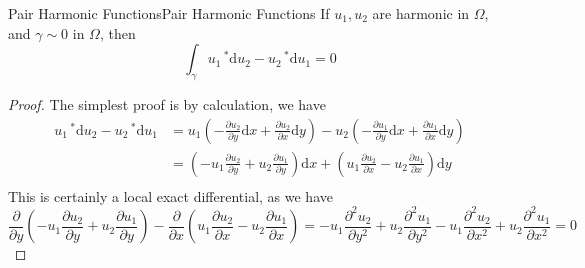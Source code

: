 \documentclass[../main.tex]{subfiles}
\begin{document}
\begin{theorem}{Pair Harmonic Functions}{Pair Harmonic Functions}
	If $u_1,u_2$ are harmonic in $\Omega$, and $\gamma\sim 0$ in $\Omega$, then
	\begin{equation}
		\int_{\gamma} u_1 \, ^* \mathrm{d} u_2 - u_2 \, ^* \mathrm{d} u_1 = 0
	\end{equation}
\end{theorem}
\begin{proof}
	The simplest proof is by calculation, we have
	\begin{equation*}
		\begin{aligned}
			u_1 \, ^* \mathrm{d} u_2 - u_2 \, ^* \mathrm{d} u_1 &= u_1 \left(-\frac{\partial u_2}{\partial y} \mathrm{d} x + \frac{\partial u_2}{\partial x} \mathrm{d} y\right) - u_2 \left(-\frac{\partial u_1}{\partial y} \mathrm{d} x + \frac{\partial u_1}{\partial x} \mathrm{d} y\right)\\
									    &= \left(-u_1 \frac{\partial u_2}{\partial y} + u_2 \frac{\partial u_1}{\partial y}\right) \mathrm{d} x + \left(u_1 \frac{\partial u_2}{\partial x} - u_2 \frac{\partial u_1}{\partial x}\right) \mathrm{d} y\\
		\end{aligned}
	\end{equation*}
	This is certainly a local exact differential, as we have
	\begin{equation*}
		\frac{\partial }{\partial y} \left( -u_1 \frac{\partial u_2}{\partial y} + u_2 \frac{\partial u_1}{\partial y}\right) - \frac{\partial }{\partial x} \left(u_1 \frac{\partial u_2}{\partial x} - u_2 \frac{\partial u_1}{\partial x}\right) = -u_1 \frac{\partial ^2 u_2}{\partial y^2} + u_2 \frac{\partial ^2 u_1}{\partial y^2} - u_1 \frac{\partial ^2 u_2}{\partial x^2} + u_2 \frac{\partial ^2 u_1}{\partial x^2} = 0
	\end{equation*}
\end{proof}
\end{document}
